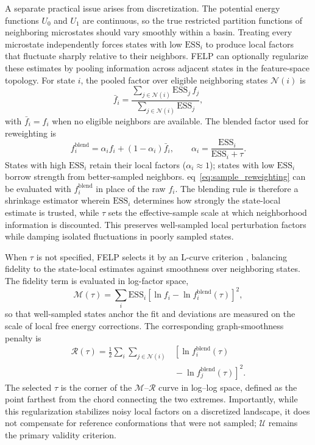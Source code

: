 \documentclass[journal=jctcce,manuscript=article,layout=twocolumn,hyperref=true]{achemso}
\newcommand{\eqnref}[1]{eq~\ref{#1}}
\begin{document}
	A separate practical issue arises from discretization. The potential energy functions $U_0$ and $U_1$ are continuous, so the true restricted partition functions of neighboring microstates should vary smoothly within a basin. Treating every microstate independently forces states with low $\mathrm{ESS}_i$ to produce local factors that fluctuate sharply relative to their neighbors. FELP can optionally regularize these estimates by pooling information across adjacent states in the feature-space topology. For state $i$, the pooled factor over eligible neighboring states $\mathcal{N}(i)$ is
	\begin{equation}
		\bar{f}_i =
		\frac{\sum_{j \in \mathcal{N}(i)} \mathrm{ESS}_j\, f_j}
		{\sum_{j \in \mathcal{N}(i)} \mathrm{ESS}_j},
	\end{equation}
	with $\bar{f}_i=f_i$ when no eligible neighbors are available. The blended factor used for reweighting is
	\begin{equation}
		f_i^{\mathrm{blend}} =
		\alpha_i f_i + (1-\alpha_i)\bar{f}_i,
		\qquad
		\alpha_i = \frac{\mathrm{ESS}_i}{\mathrm{ESS}_i + \tau}.
		\label{eq:neighbor_blend}
	\end{equation}
	States with high $\mathrm{ESS}_i$ retain their local factors ($\alpha_i \approx 1$); states with low $\mathrm{ESS}_i$ borrow strength from better-sampled neighbors. \eqnref{eq:sample_reweighting} can be evaluated with $f_i^{\mathrm{blend}}$ in place of the raw $f_i$. The blending rule is therefore a shrinkage estimator wherein $\mathrm{ESS}_i$ determines how strongly the state-local estimate is trusted, while $\tau$ sets the effective-sample scale at which neighborhood information is discounted. This preserves well-sampled local perturbation factors while damping isolated fluctuations in poorly sampled states.
	
	When $\tau$ is not specified, FELP selects it by an L-curve criterion \cite{hansen1993lcurve}, balancing fidelity to the state-local estimates against smoothness over neighboring states. The fidelity term is evaluated in log-factor space,
	\begin{equation}
		\mathcal{M}(\tau) =
		\sum_i \mathrm{ESS}_i \left[\ln f_i - \ln f_i^{\mathrm{blend}}(\tau)\right]^2,
	\end{equation}
	so that well-sampled states anchor the fit and deviations are measured on the scale of local free energy corrections. The corresponding graph-smoothness penalty is
\begin{equation}
		\begin{aligned}
			\mathcal{R}(\tau) =
			\frac{1}{2}
			\sum_{i}
			\sum_{j \in \mathcal{N}(i)}
			&\left[
			\ln f_i^{\mathrm{blend}}(\tau)
			\right.\\
			&\left.
			{} - \ln f_j^{\mathrm{blend}}(\tau)
			\right]^2 .
		\end{aligned}
\end{equation}
	The selected $\tau$ is the corner of the $\mathcal{M}$--$\mathcal{R}$ curve in log--log space, defined as the point farthest from the chord connecting the two extremes. Importantly, while this regularization stabilizes noisy local factors on a discretized landscape, it does not compensate for reference conformations that were not sampled; $\mathcal{U}$ remains the primary validity criterion.
	
\end{document}
